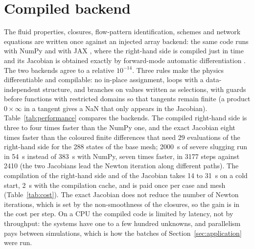 \documentclass[a4paper,fleqn]{cas-sc}
\begin{document}
\begin{table}[htbp]
\caption{Ablation: the application case (choke open at the base point, blocked start, \SI{4000}{\second}) without one ingredient at a time.}\label{tab:ablation}
\footnotesize
\resizebox{\textwidth}{!}{}

\end{table}

\section{Compiled backend}\label{sec:backend}

The fluid properties, closures, flow-pattern identification, schemes and network equations are written once against an injected array backend: the same code runs with NumPy and with JAX \citep{bradbury2018}, where the right-hand side is compiled just in time and its Jacobian is obtained exactly by forward-mode automatic differentiation \citep{griewank2008}. The two backends agree to a relative $10^{-14}$. Three rules make the physics differentiable and compilable: no in-place assignment, loops with a data-independent structure, and branches on values written as selections, with guards before functions with restricted domains so that tangents remain finite (a product $0 \times \infty$ in a tangent gives a NaN that only appears in the Jacobian). Table~\ref{tab:performance} compares the backends. The compiled right-hand side is three to four times faster than the NumPy one, and the exact Jacobian eight times faster than the coloured finite differences \citep{curtis1974} that need 29 evaluations of the right-hand side for the 288 states of the base mesh; \SI{2000}{\second} of severe slugging run in \SI{54}{\second} instead of \SI{383}{\second} with NumPy, seven times faster, in \num{3177} steps against \num{2410} (the two Jacobians lead the Newton iteration along different paths). The compilation of the right-hand side and of the Jacobian takes 14 to \SI{31}{\second} on a cold start, \SI{2}{\second} with the compilation cache, and is paid once per case and mesh (Table~\ref{tab:cost}). The exact Jacobian does not reduce the number of Newton iterations, which is set by the non-smoothness of the closures, so the gain is in the cost per step. On a CPU the compiled code is limited by latency, not by throughput: the systems have one to a few hundred unknowns, and parallelism pays between simulations, which is how the batches of Section~\ref{sec:application} were run.
\end{document}
